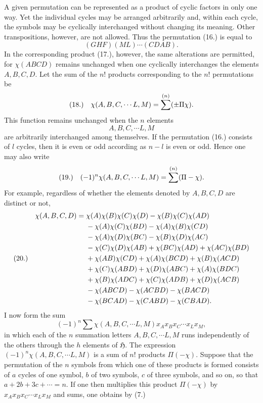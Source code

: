 \documentclass[11pt]{article}
\makeatletter
\newcommand{\Hgrp}{\mathfrak{H}}
\newcommand{\frobtag}[2]{\[\begin{array}{@{}r@{\quad}l@{}}\textup{(#1)} & \displaystyle #2\end{array}\]}
\newcommand{\frobtagc}[2]{\[\begin{array}{@{}r@{\quad}c@{}}\textup{(#1)} & \displaystyle #2\end{array}\]}
\makeatother
\begin{document}
A given permutation can be represented as a product of cyclic factors in only one way. Yet the individual cycles may be arranged arbitrarily and, within each cycle, the symbols may be cyclically interchanged without changing its meaning. Other transpositions, however, are not allowed. Thus the permutation (16.) is equal to
\[
(GHF)(ML)\cdots(CDAB).
\]
In the corresponding product (17.), however, the same alterations are permitted, for $\chi(ABCD)$ remains unchanged when one cyclically interchanges the elements $A,B,C,D$. Let the sum of the $n!$ products corresponding to the $n!$ permutations be
\frobtagc{18.}{\chi(A,B,C,\cdots L,M)=\sum^{(n)}(\pm\Pi\chi).}
This function remains unchanged when the $n$ elements
\[
A,B,C,\cdots L,M
\]
are arbitrarily interchanged among themselves. If the permutation (16.) consists of $l$ cycles, then it is even or odd according as $n-l$ is even or odd. Hence one may also write
\frobtagc{19.}{(-1)^n\chi(A,B,C,\cdots L,M)=\sum^{(n)}(\Pi-\chi).}
For example, regardless of whether the elements denoted by $A,B,C,D$ are distinct or not,
\frobtag{20.}{\begin{aligned}
\chi(A,B,C,D)={}&\chi(A)\chi(B)\chi(C)\chi(D)-\chi(B)\chi(C)\chi(AD)\nobreak\\
&{}-\chi(A)\chi(C)\chi(BD)-\chi(A)\chi(B)\chi(CD)\nobreak\\
&{}-\chi(A)\chi(D)\chi(BC)-\chi(B)\chi(D)\chi(AC)\nobreak\\
&{}-\chi(C)\chi(D)\chi(AB)+\chi(BC)\chi(AD)+\chi(AC)\chi(BD)\nobreak\\
&{}+\chi(AB)\chi(CD)+\chi(A)\chi(BCD)+\chi(B)\chi(ACD)\nobreak\\
&{}+\chi(C)\chi(ABD)+\chi(D)\chi(ABC)+\chi(A)\chi(BDC)\nobreak\\
&{}+\chi(B)\chi(ADC)+\chi(C)\chi(ADB)+\chi(D)\chi(ACB)\nobreak\\
&{}-\chi(ABCD)-\chi(ACBD)-\chi(BACD)\nobreak\\
&{}-\chi(BCAD)-\chi(CABD)-\chi(CBAD).
\end{aligned}}
I now form the sum
\[
(-1)^n\sum\chi(A,B,C,\cdots L,M)x_Ax_Bx_C\cdots x_Lx_M,
\]
in which each of the $n$ summation letters $A,B,C,\cdots L,M$ runs independently of the others through the $h$ elements of $\Hgrp$. The expression $(-1)^n\chi(A,B,C,\cdots L,M)$ is a sum of $n!$ products $\Pi(-\chi)$. Suppose that the permutation of the $n$ symbols from which one of these products is formed consists of $a$ cycles of one symbol, $b$ of two symbols, $c$ of three symbols, and so on, so that $a+2b+3c+\cdots=n$. If one then multiplies this product $\Pi(-\chi)$ by $x_Ax_Bx_C\cdots x_Lx_M$ and sums, one obtains by (7.)
\end{document}
